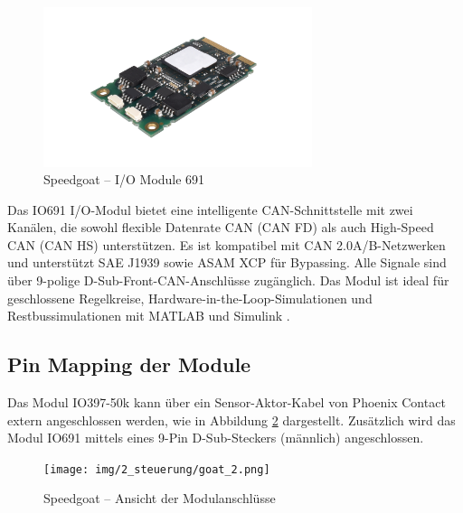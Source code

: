 \begin{figure}[ht]
	\begin{center}
		\includegraphics[width=0.7\textwidth]{img/2_steuerung/goat_io691.png}
		\caption{Speedgoat – I/O Module 691 \cite{speedgoat:IO691}}
		\label{img_2_2:goat:IO691}
	\end{center}
\end{figure}

Das IO691 I/O-Modul bietet eine intelligente CAN-Schnittstelle mit zwei Kanälen, die sowohl flexible Datenrate CAN (CAN FD) als auch High-Speed CAN (CAN HS) unterstützen. Es ist kompatibel mit CAN 2.0A/B-Netzwerken und unterstützt SAE J1939 sowie ASAM XCP für Bypassing. Alle Signale sind über 9-polige D-Sub-Front-CAN-Anschlüsse zugänglich. Das Modul ist ideal für geschlossene Regelkreise, Hardware-in-the-Loop-Simulationen und Restbussimulationen mit MATLAB und Simulink \cite{speedgoat:IO691}.

\subsection{Pin Mapping der Module}
Das Modul IO397-50k kann über ein Sensor-Aktor-Kabel von Phoenix Contact extern angeschlossen werden, wie in Abbildung \ref{img_2_2:steuerung_goat:2} dargestellt.
Zusätzlich wird das Modul IO691 mittels eines 9-Pin D-Sub-Steckers (männlich) angeschlossen.

\begin{figure}[ht]
	\begin{center}
		\texttt{[image: img/2\_steuerung/goat\_2.png]}
		\caption{Speedgoat – Ansicht der Modulanschlüsse}
		\label{img_2_2:steuerung_goat:2}
	\end{center}
\end{figure}


